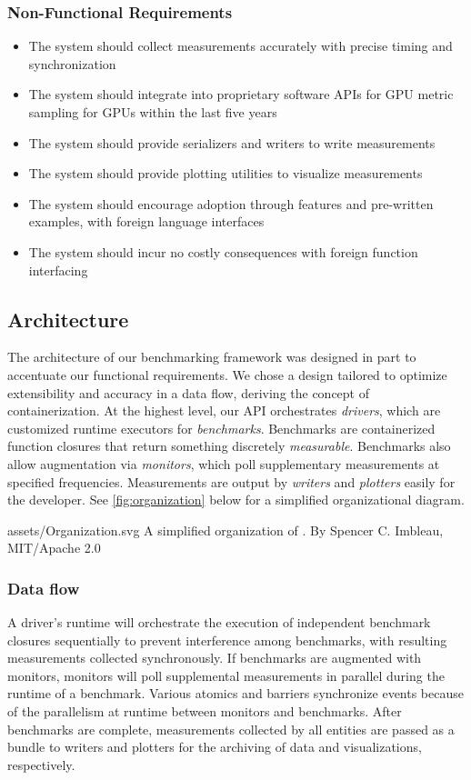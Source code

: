\subsubsection{Non-Functional Requirements}
\begin{itemize}
	\item The system should collect measurements accurately with precise timing and synchronization
	\item The system should integrate into proprietary software APIs for GPU metric sampling for GPUs within the last five years
	\item The system should provide serializers and writers to write measurements
	\item The system should provide plotting utilities to visualize measurements
	\item The system should encourage adoption through features and pre-written examples, with foreign language interfaces
	\item The system should incur no costly consequences with foreign function interfacing
\end{itemize}

\subsection{Architecture}

The architecture of our benchmarking framework was designed in part to accentuate our functional requirements. We chose a design tailored to optimize extensibility and accuracy in a data flow, deriving the concept of containerization. At the highest level, our API orchestrates \emph{drivers}, which are customized runtime executors for \emph{benchmarks}. Benchmarks are containerized function closures that return something discretely \emph{measurable}. Benchmarks also allow augmentation via \emph{monitors}, which poll supplementary measurements at specified frequencies. Measurements are output by \emph{writers} and \emph{plotters} easily for the developer. See \cref{fig:organization} below for a simplified organizational diagram.\medskip

\widesvg
{assets/Organization.svg}
{A simplified organization of \toollinkedname.\label{fig:organization}}
{By Spencer C. Imbleau, MIT/Apache 2.0}
\medskip

\subsubsection{Data flow}
A driver's runtime will orchestrate the execution of independent benchmark closures sequentially to prevent interference among benchmarks, with resulting measurements collected synchronously. If benchmarks are augmented with monitors, monitors will poll supplemental measurements in parallel during the runtime of a benchmark. Various atomics and barriers synchronize events because of the parallelism at runtime between monitors and benchmarks. After benchmarks are complete, measurements collected by all entities are passed as a bundle to writers and plotters for the archiving of data and visualizations, respectively.\medskip

